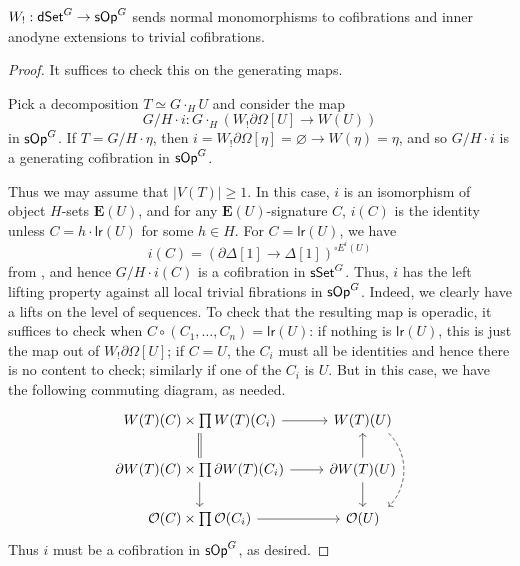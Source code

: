 \documentclass[a4paper,10pt
,draft
]{article}%
\renewcommand{\1}{\eta}%
\begin{document}
\begin{proposition}[{cf. \cite[Prop. 4.5]{CM11}}]
      \label{W!_COF_PROP}
      $W_!: \mathsf{dSet}^G \to \mathsf{sOp}^G$ sends normal monomorphisms to cofibrations and inner anodyne extensions to trivial cofibrations.
\end{proposition}
\begin{proof}
      It suffices to check this on the generating maps.

      Pick a decomposition $T \simeq G \cdot_H U$ and consider the map
      \begin{equation}
            G/H \cdot i: G \cdot_H \left( W_! \partial \Omega[U] \to W(U) \right)      
      \end{equation}
      in $\mathsf{sOp}^G$.
      If $T = G/H \cdot \eta$, then $i = W_! \partial \Omega[\eta] = \varnothing \to W(\eta) = \eta$,
      and so $G/H \cdot i$ is a generating cofibration in $\mathsf{sOp}^G$.

      Thus we may assume that $|V(T)| \geq 1$.
      In this case, $i$ is an isomorphism of object $H$-sets $\mathbf E(U)$,
      and for any $\mathbf E(U)$-signature $C$,
      $i(C)$ is the identity unless $C = h \cdot \mathsf{lr} (U)$ for some $h \in H$.
      For $C = \mathsf{lr}(U)$, we have
      \[
            i(C) = (\partial \Delta[1] \to \Delta[1])^{\square E^i(U)}
      \]
      from \cite[Prop. 4.5]{CM11},
      and hence $G/H \cdot i(C)$ is a cofibration in $\mathsf{sSet}^G$.
      Thus, $i$ has the left lifting property against all local trivial fibrations in $\mathsf{sOp}^G$.
      {\color{OliveGreen}
        Indeed, we clearly have a lifts on the level of sequences.
        To check that the resulting map is operadic, it suffices to check when $C \circ (C_1, \dots, C_n) = \mathsf{lr}(U)$:
        if nothing is $\mathsf{lr}(U)$, this is just the map out of $W_!\partial \Omega[U]$;
        if $C = U$, the $C_i$ must all be identities and hence there is no content to check;
        similarly if one of the $C_i$ is $U$.
        But in this case, we have the following commuting diagram, as needed.
        \begin{equation}
              \begin{tikzcd}
                    W(T)(C) \times \prod W(T)(C_i) \arrow[r] \arrow[d, equal]
                    &
                    W(T)(U) \arrow[shift left = 4, dd, bend left = 45, dashed]
                    \\
                    \partial W(T)(C) \times \prod \partial W(T)(C_i) \arrow[r] \arrow[d]
                    &
                    \partial W(T)(U) \arrow[u] \arrow[d]
                    \\
                    \O(C) \times \prod \O(C_i) \arrow[r]
                    &
                    \O(U)
              \end{tikzcd}
        \end{equation}
      } %
      Thus $i$ must be a cofibration in $\mathsf{sOp}^G$, as desired.


\end{proof}
\end{document}
